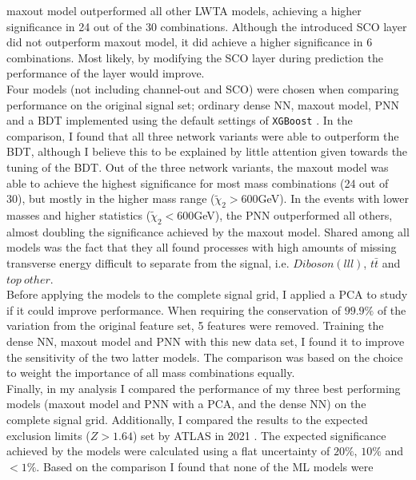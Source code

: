 maxout model outperformed all other \ac{LWTA} models, achieving a higher significance in 24 out of the 30 combinations. Although the introduced \ac{SCO} layer did not outperform maxout model, it did achieve a higher significance in 6 
combinations. Most likely, by modifying the \ac{SCO} layer during prediction the performance of the layer would improve.
\\\newline
Four models (not including channel-out and \ac{SCO}) were chosen when comparing performance on the original signal set; ordinary dense \ac{NN}, maxout model, \ac{PNN} and a \ac{BDT} implemented using the default settings of \verb!XGBoost! \cite{XGB}. In the comparison, 
I found that all three network variants were able to outperform the \ac{BDT}, although I believe this to be explained by little attention given towards the tuning of the \ac{BDT}. Out of the three network variants, the maxout model was able to achieve 
the highest significance for most mass combinations (24 out of 30), but mostly in the higher mass range ($\tilde{\chi}_2>600$GeV). In the events with lower masses and higher statistics ($\tilde{\chi}_2<600$GeV), the \ac{PNN} outperformed all others, 
almost doubling the significance achieved by the maxout model. Shared among all models was the fact that they all found processes with high amounts of missing transverse energy difficult to separate from the signal, i.e. $Diboson(lll)$, $t\bar{t}$ and $top\ other$.
\\\newline
Before applying the models to the complete signal grid, I applied a \ac{PCA} to study if it could improve performance. When requiring the conservation of $99.9\%$ of the variation from the original feature set, 5 features were removed.
Training the dense \ac{NN}, maxout model and \ac{PNN} with this new data set, I found it to improve the sensitivity of the two latter models. The comparison was based on the choice to weight the importance of all mass combinations equally.
\\\newline
Finally, in my analysis I compared the performance of my three best performing models (maxout model and \ac{PNN} with a \ac{PCA}, and the dense \ac{NN}) on the complete signal grid. Additionally, I compared the results to the expected exclusion 
limits ($Z>1.64$) set by \ac{ATLAS} in 2021 \cite{atlas_search_2021}. The expected significance achieved by the models were calculated using a flat uncertainty of $20\%$, $10\%$ and $<1\%$. Based on the comparison I found that none of the \ac{ML} models were 
